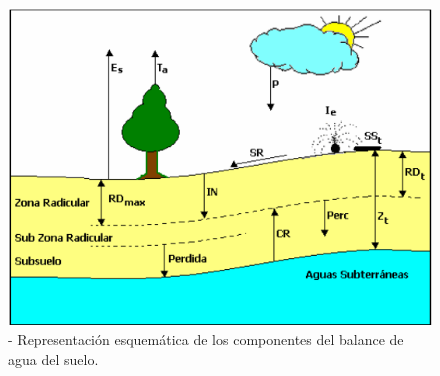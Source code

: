 \begin{figure}[!h]
	\centering
	\includegraphics[scale=0.8]{Images/representacion_esquematica_de_los_componentes_del_balance_del_agua_suelo.png}
	\caption{- Representación esquemática de los componentes del balance de agua del suelo. \parencite{sebem2005aportaciones}}
	\label{fig:img_4}
\end{figure}

